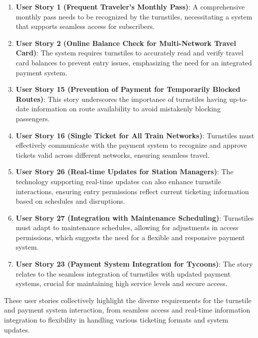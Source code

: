 \begin{enumerate}[noitemsep]
    \item \textbf{User Story 1 (Frequent Traveler's Monthly Pass)}: A comprehensive monthly pass needs to be recognized by the turnstiles, necessitating a system that supports seamless access for subscribers.
    
    \item \textbf{User Story 2 (Online Balance Check for Multi-Network Travel Card)}: The system requires turnstiles to accurately read and verify travel card balances to prevent entry issues, emphasizing the need for an integrated payment system.
    
    \item \textbf{User Story 15 (Prevention of Payment for Temporarily Blocked Routes)}: This story underscores the importance of turnstiles having up-to-date information on route availability to avoid mistakenly blocking passengers.
    
    \item \textbf{User Story 16 (Single Ticket for All Train Networks)}: Turnstiles must effectively communicate with the payment system to recognize and approve tickets valid across different networks, ensuring seamless travel.
    
    \item \textbf{User Story 26 (Real-time Updates for Station Managers)}: The technology supporting real-time updates can also enhance turnstile interactions, ensuring entry permissions reflect current ticketing information based on schedules and disruptions.
    
    \item \textbf{User Story 27 (Integration with Maintenance Scheduling)}: Turnstiles must adapt to maintenance schedules, allowing for adjustments in access permissions, which suggests the need for a flexible and responsive payment system.
    
    \item \textbf{User Story 23 (Payment System Integration for Tycoons)}: The story relates to the seamless integration of turnstiles with updated payment systems, crucial for maintaining high service levels and secure access.
\end{enumerate}

These user stories collectively highlight the diverse requirements for the turnstile and payment system interaction, from seamless access and real-time information integration to flexibility in handling various ticketing formats and system updates.

